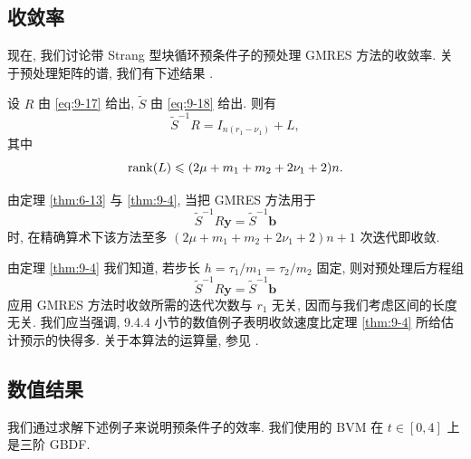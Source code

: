 \subsection{收敛率}
\label{sec:9-4-3}

现在, 我们讨论带 Strang 型块循环预条件子的预处理 GMRES 方法的收敛率. 关于预处理矩阵的谱, 我们有下述结果 \cite{src:44}.

\begin{theorem}
\label{thm:9-4}
设 $R$ 由 \eqref{eq:9-17} 给出, $\widetilde{S}$ 由 \eqref{eq:9-18} 给出. 则有
\[
  \widetilde{S}^{-1}R=I_{n(r_1-\nu_1)}+L,
\]
其中
\[
  \operatorname{rank}(L)\leqslant(2\mu+m_1+m_2+2\nu_1+2)n.
\]
\end{theorem}

由定理 \ref{thm:6-13} 与 \ref{thm:9-4}, 当把 GMRES 方法用于
\[
  \widetilde{S}^{-1}R\mathbf{y}=\widetilde{S}^{-1}\mathbf{b}
\]
时, 在精确算术下该方法至多 $(2\mu+m_1+m_2+2\nu_1+2)n+1$ 次迭代即收敛.

由定理 \ref{thm:9-4} 我们知道, 若步长 $h=\tau_1/m_1=\tau_2/m_2$ 固定, 则对预处理后方程组
\[
  \widetilde{S}^{-1}R\mathbf{y}=\widetilde{S}^{-1}\mathbf{b}
\]
应用 GMRES 方法时收敛所需的迭代次数与 $r_1$ 无关, 因而与我们考虑区间的长度无关. 我们应当强调, 9.4.4 小节的数值例子表明收敛速度比定理 \ref{thm:9-4} 所给估计预示的快得多. 关于本算法的运算量, 参见 \cite{src:44,src:58}.

\subsection{数值结果}
\label{sec:9-4-4}

我们通过求解下述例子来说明预条件子的效率. 我们使用的 BVM 在 $t\in[0,4]$ 上是三阶 GBDF.

